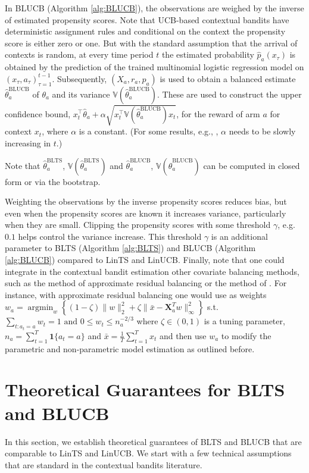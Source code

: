 \documentclass[letterpaper]{article} %
\newcommand{\field}[1]{\mathbb{#1}}
\def\V{\field{V}}
\def\V{\mathbb{V}}
\DeclareMathOperator*{\argmin}{argmin}
\begin{document}
In BLUCB (Algorithm \ref{alg:BLUCB}), the observations are weighed by the inverse of estimated propensity scores.
Note that UCB-based contextual bandits have deterministic assignment rules and conditional on the context the propensity score is either zero or one.
But with the standard assumption that the arrival of contexts is random, at every time period $t$ the estimated probability $\hat{p}_a(x_\tau)$ 
is obtained by the prediction of the trained multinomial logistic regression model on  $(x_\tau, a_\tau)_{\tau=1}^{t-1}$.
Subsequently, $(X_a, r_a, \hat{p}_a)$ is used to obtain a balanced estimate $\hat{\theta}^{\text{BLUCB}}_a$ of $\theta_a$ and its variance $\V(\hat\theta^\text{BLUCB}_a)$. These are used to construct the upper confidence bound, $x_t^\top \hat{\theta}_a + \alpha \sqrt{x_t^\top \V(\hat\theta^\text{BLUCB}_a) x_t}$, for the reward of arm $a$ for context $x_t$,  where $\alpha$ is a constant. (For some results, e.g., \cite{auer2002using}, $\alpha$ needs to be slowly increasing in $t$.)

Note that $\hat{\theta}^\text{BLTS}_a$, $\V(\hat\theta^\text{BLTS}_a)$ and $\hat{\theta}^\text{BLUCB}_a$, $\V(\hat\theta^\text{BLUCB}_a)$ can be computed in closed form or via the bootstrap.

Weighting the observations by the inverse propensity scores reduces bias, but even when the propensity scores are known it increases variance, particularly when they are small. Clipping the propensity scores \cite{crump2009dealing} with some threshold  $\gamma$, e.g. $0.1$ helps control the variance increase. This threshold $\gamma$ is an additional parameter to BLTS (Algorithm \ref{alg:BLTS}) and BLUCB (Algorithm \ref{alg:BLUCB}) compared to LinTS and LinUCB.
Finally, note that one could integrate in the contextual bandit estimation other covariate balancing methods, such as the method of approximate residual balancing \cite{athey-arb} or the method of \cite{kallus-offline}. 
For instance, with approximate residual balancing one would use as weights
$w_a = \argmin_w \left\{ (1- \zeta) \lVert w\rVert_2^2 + \zeta \lVert \bar{x} - \textbf{X}_a^T w \rVert_\infty^2\right\}$ s.t. $\sum_{t: a_t = a} w_t = 1 \text{ and } 0 \leq w_t \leq n_a^{-2/3}$
where $\zeta \in (0, 1)$ is a tuning parameter, $n_a =  \sum_{t = 1}^{T} \textbf{1} \{a_t = a\}$ and $\bar{x} = \frac{1}{T} \sum_{t = 1}^{T} x_t$ and then use $w_a$ to modify the parametric and non-parametric model estimation as outlined before. 

\section{Theoretical Guarantees for BLTS and BLUCB} \label{theory}
In this section, we establish theoretical guarantees of BLTS and BLUCB that are comparable to LinTS and LinUCB. We start with a few technical assumptions that are standard in the contextual bandits literature.
\end{document}
